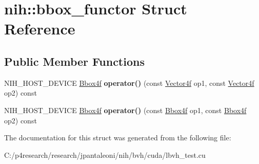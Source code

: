 \hypertarget{structnih_1_1bbox__functor}{
\section{nih\-:\-:bbox\-\_\-functor \-Struct \-Reference}
\label{structnih_1_1bbox__functor}
}
\subsection*{\-Public \-Member \-Functions}
\begin{DoxyCompactItemize}
\item 
\hypertarget{structnih_1_1bbox__functor_ade0e8ea51d882e2bbf5f6f29717a50cd}{
\-N\-I\-H\-\_\-\-H\-O\-S\-T\-\_\-\-D\-E\-V\-I\-C\-E \hyperlink{structnih_1_1_bbox}{\-Bbox4f} {\bfseries operator()} (const \hyperlink{structnih_1_1_vector}{\-Vector4f} op1, const \hyperlink{structnih_1_1_vector}{\-Vector4f} op2) const }
\label{structnih_1_1bbox__functor_ade0e8ea51d882e2bbf5f6f29717a50cd}

\item 
\hypertarget{structnih_1_1bbox__functor_a7b056f7a5bac15e09c3300e5a3d04516}{
\-N\-I\-H\-\_\-\-H\-O\-S\-T\-\_\-\-D\-E\-V\-I\-C\-E \hyperlink{structnih_1_1_bbox}{\-Bbox4f} {\bfseries operator()} (const \hyperlink{structnih_1_1_bbox}{\-Bbox4f} op1, const \hyperlink{structnih_1_1_bbox}{\-Bbox4f} op2) const }
\label{structnih_1_1bbox__functor_a7b056f7a5bac15e09c3300e5a3d04516}

\end{DoxyCompactItemize}


\-The documentation for this struct was generated from the following file\-:\begin{DoxyCompactItemize}
\item 
\-C\-:/p4research/research/jpantaleoni/nih/bvh/cuda/lbvh\-\_\-test.\-cu\end{DoxyCompactItemize}
